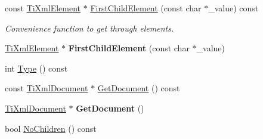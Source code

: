 \begin{DoxyCompactItemize}
\item 
\hypertarget{class_ti_xml_node_a0ec361bfef1cf1978d060295f597e0d9}{
const \hyperlink{class_ti_xml_element}{\-Ti\-Xml\-Element} $\ast$ \hyperlink{class_ti_xml_node_a0ec361bfef1cf1978d060295f597e0d9}{\-First\-Child\-Element} (const char $\ast$\-\_\-value) const }
\label{class_ti_xml_node_a0ec361bfef1cf1978d060295f597e0d9}

\begin{DoxyCompactList}\small\item\em \-Convenience function to get through elements. \end{DoxyCompactList}\item 
\hypertarget{class_ti_xml_node_a6936ae323675071808ac4840379e57f5}{
\hyperlink{class_ti_xml_element}{\-Ti\-Xml\-Element} $\ast$ {\bfseries \-First\-Child\-Element} (const char $\ast$\-\_\-value)}
\label{class_ti_xml_node_a6936ae323675071808ac4840379e57f5}

\item 
int \hyperlink{class_ti_xml_node_a57b99d5c97d67a42b9752f5210a1ba5e}{\-Type} () const 
\item 
const \hyperlink{class_ti_xml_document}{\-Ti\-Xml\-Document} $\ast$ \hyperlink{class_ti_xml_node_aa66f4ebcd175204a168ed7c2d7b43071}{\-Get\-Document} () const 
\item 
\hypertarget{class_ti_xml_node_a7b2372c0e7adfb32f5b6902fe49a39b2}{
\hyperlink{class_ti_xml_document}{\-Ti\-Xml\-Document} $\ast$ {\bfseries \-Get\-Document} ()}
\label{class_ti_xml_node_a7b2372c0e7adfb32f5b6902fe49a39b2}

\item 
\hypertarget{class_ti_xml_node_aeed21ad30630ef6e7faf096127edc9f3}{
bool \hyperlink{class_ti_xml_node_aeed21ad30630ef6e7faf096127edc9f3}{\-No\-Children} () const }
\label{class_ti_xml_node_aeed21ad30630ef6e7faf096127edc9f3}


\end{DoxyCompactItemize}
